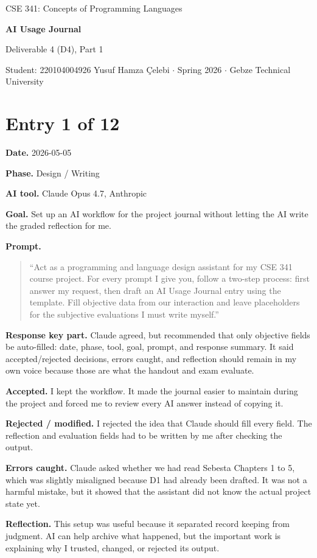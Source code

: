\documentclass[11pt,a4paper]{article}
\newcommand{\field}[2]{\textbf{#1.} #2\par}
\newcommand{\prompt}[1]{%
  \textbf{Prompt.}
  \begin{quote}\small #1\end{quote}
}
\begin{document}
\begin{center}
  {\footnotesize\color{anscaption}CSE 341: Concepts of Programming Languages\par}
  \vspace{3pt}
  {\huge\bfseries\sffamily AI Usage Journal\par}
  \vspace{4pt}
  {\large Deliverable 4 (D4), Part 1\par}
  \vspace{6pt}
  {\footnotesize\color{anscaption}
    Student: 220104004926 Yusuf Hamza Çelebi \(\cdot\)
    Spring 2026 \(\cdot\)
    Gebze Technical University\par}
\end{center}
\vspace{8pt}

\section{Entry 1 of 12}
\field{Date}{2026-05-05}
\field{Phase}{Design / Writing}
\field{AI tool}{Claude Opus 4.7, Anthropic}
\field{Goal}{Set up an AI workflow for the project journal without letting the AI write the graded reflection for me.}
\prompt{``Act as a programming and language design assistant for my CSE 341 course project. For every prompt I give you, follow a two-step process: first answer my request, then draft an AI Usage Journal entry using the template. Fill objective data from our interaction and leave placeholders for the subjective evaluations I must write myself.''}
\field{Response key part}{Claude agreed, but recommended that only objective fields be auto-filled: date, phase, tool, goal, prompt, and response summary. It said accepted/rejected decisions, errors caught, and reflection should remain in my own voice because those are what the handout and exam evaluate.}
\field{Accepted}{I kept the workflow. It made the journal easier to maintain during the project and forced me to review every AI answer instead of copying it.}
\field{Rejected / modified}{I rejected the idea that Claude should fill every field. The reflection and evaluation fields had to be written by me after checking the output.}
\field{Errors caught}{Claude asked whether we had read Sebesta Chapters 1 to 5, which was slightly misaligned because D1 had already been drafted. It was not a harmful mistake, but it showed that the assistant did not know the actual project state yet.}
\field{Reflection}{This setup was useful because it separated record keeping from judgment. AI can help archive what happened, but the important work is explaining why I trusted, changed, or rejected its output.}
\end{document}
